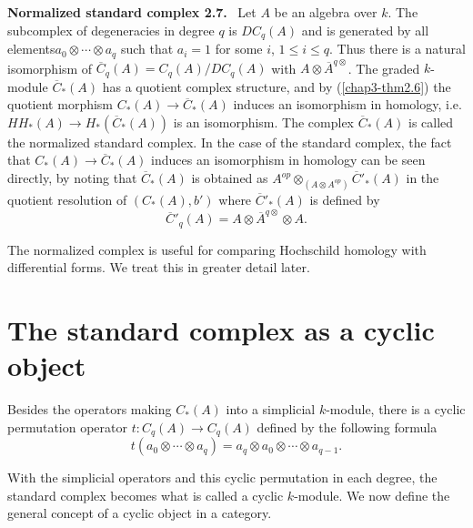 \noindent
{\bf Normalized standard complex 2.7.}~ Let $A$ be an algebra over
$k$. The subcomplex of degeneracies in degree $q$ is $DC_{q}(A)$ and
is generated by all elements\pageoriginale $a_{0}\otimes\cdots\otimes
a_{q}$ such that $a_{i}=1$ for some $i$, $1\leq i\leq q$. Thus there
is a natural isomorphism of $\overline{C}_{q}(A)=C_{q}(A)/DC_{q}(A)$
with $A\otimes \overline{A}^{q\otimes}$. The graded $k$-module
$\overline{C}_{\ast}(A)$ has a quotient complex structure, and by 
(\ref{chap3-thm2.6}) the quotient morphism $C_{\ast}(A)\to
\overline{C}_{\ast}(A)$ induces an isomorphism in homology, i.e.\@
$HH_{\ast}(A)\to H_{\ast}(\overline{C}_{\ast}(A))$ is an
isomorphism. The complex $\overline{C}_{\ast}(A)$ is called the
normalized standard complex. In the case of the standard complex, the
fact that $C_{\ast}(A)\to \overline{C}_{\ast}(A)$ induces an
isomorphism in homology can be seen directly, by noting that
$\overline{C}_{\ast}(A)$ is obtained as $A^{op}\otimes_{(A\otimes
  A^{op})}\overline{C}'_{\ast}(A)$ in the quotient resolution of
$(C_{\ast}(A),b')$ where $\overline{C}'_{\ast}(A)$ is defined by
$$
\overline{C}'_{q}(A)=A\otimes \overline{A}^{q\otimes}\otimes A.
$$

The normalized complex is useful for comparing Hochschild homology
with differential forms. We treat this in greater detail later.

\section{The standard complex as a cyclic
  object}\label{chap3-sec3}

\begin{remark}\label{chap3-rem3.1}
Besides the operators making $C_{\ast}(A)$ into a simplicial
$k$-module, there is a cyclic permutation operator $t:C_{q}(A)\to
C_{q}(A)$ defined by the following formula
$$
t(a_{0}\otimes \cdots\otimes a_{q})=a_{q}\otimes a_{0}\otimes
\cdots\otimes a_{q-1}.
$$

With the simplicial operators and this cyclic permutation in each
degree, the standard complex becomes what is called a cyclic
$k$-module. We now define the general concept of a cyclic object in a
category. 
\end{remark}

